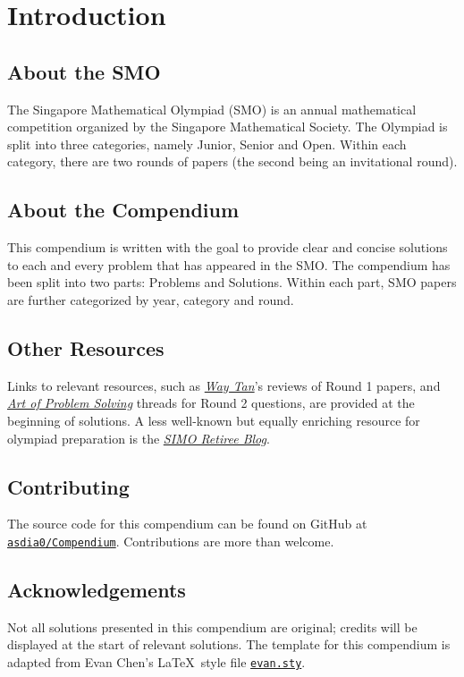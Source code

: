 \chapter*{Introduction}

\section*{About the SMO}
The Singapore Mathematical Olympiad (SMO) is an annual mathematical competition organized by the Singapore Mathematical Society. The Olympiad is split into three categories, namely Junior, Senior and Open. Within each category, there are two rounds of papers (the second being an invitational round).

\section*{About the Compendium}

This compendium is written with the goal to provide clear and concise solutions to each and every problem that has appeared in the SMO. The compendium has been split into two parts: Problems and Solutions. Within each part, SMO papers are further categorized by year, category and round.

\section*{Other Resources}
Links to relevant resources, such as \href{https://www.youtube.com/c/WayTan}{\textit{Way Tan}}'s reviews of Round 1 papers, and \href{https://artofproblemsolving.com/}{\textit{Art of Problem Solving}} threads for Round 2 questions, are provided at the beginning of solutions. A less well-known but equally enriching resource for olympiad preparation is the \href{https://simoxmenblog.blogspot.com/}{\textit{SIMO Retiree Blog}}.

\section*{Contributing}

The source code for this compendium can be found on GitHub at \href{https://github.com/asdia0/Compendium}{\texttt{asdia0/Compendium}}. Contributions are more than welcome.

\section*{Acknowledgements}

Not all solutions presented in this compendium are original; credits will be displayed at the start of relevant solutions. The template for this compendium is adapted from Evan Chen's  \LaTeX\ style file \href{https://github.com/vEnhance/dotfiles/blob/main/texmf/tex/latex/evan/evan.sty}{\texttt{evan.sty}}.
